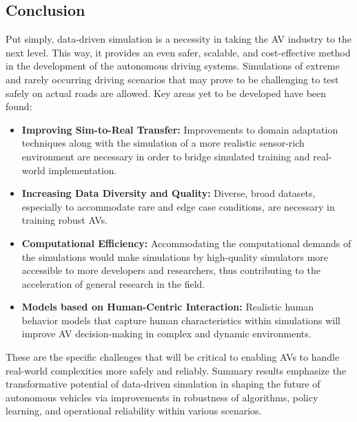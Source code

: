 \documentclass[lettersize,journal]{IEEEtran}
\begin{document}
\subsection{Conclusion}

Put simply, data-driven simulation is a necessity in taking the AV industry to the next level. This way, it provides an even safer, scalable, and cost-effective method in the development of the autonomous driving systems. Simulations of extreme and rarely occurring driving scenarios that may prove to be challenging to test safely on actual roads are allowed. Key areas yet to be developed have been found:

\begin{itemize}
    \item \textbf{Improving Sim-to-Real Transfer:} Improvements to domain adaptation techniques along with the simulation of a more realistic sensor-rich environment are necessary in order to bridge simulated training and real-world implementation.
    \item \textbf{Increasing Data Diversity and Quality:} Diverse, broad datasets, especially to accommodate rare and edge case conditions, are necessary in training robust AVs.
    \item \textbf{Computational Efficiency:} Accommodating the computational demands of the simulations would make simulations by high-quality simulators more accessible to more developers and researchers, thus contributing to the acceleration of general research in the field.
    \item \textbf{Models based on Human-Centric Interaction:} Realistic human behavior models that capture human characteristics within simulations will improve AV decision-making in complex and dynamic environments.
\end{itemize}

These are the specific challenges that will be critical to enabling AVs to handle real-world complexities more safely and reliably. Summary results emphasize the transformative potential of data-driven simulation in shaping the future of autonomous vehicles via improvements in robustness of algorithms, policy learning, and operational reliability within various scenarios.












\sloppy %
\onecolumn
\end{document}
